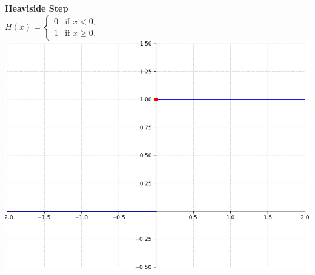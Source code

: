 \documentclass[8pt]{article}
\begin{document}
\hfill
\begin{minipage}[t]{0.24\textwidth}
    \textbf{Heaviside Step}\\
    $H(x) =
    \begin{cases}
      0 & \text{if } x < 0,\\
      1 & \text{if } x \geq 0.
    \end{cases}$ \\
    \includegraphics[width=1.05\linewidth]{images/heaviside.png}
\end{minipage}
\normalsize
\end{document}

